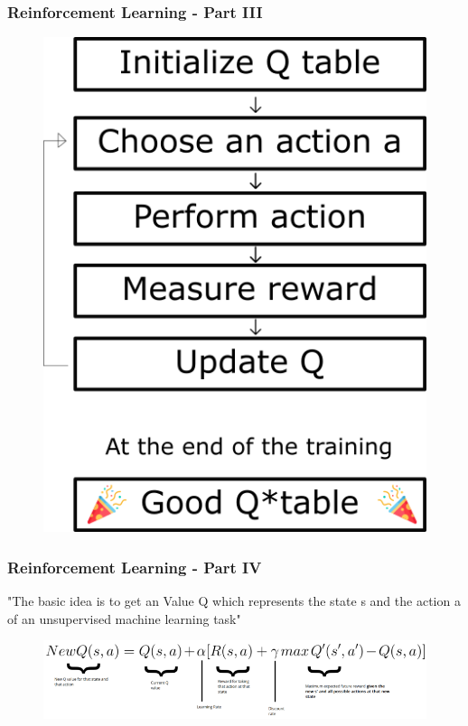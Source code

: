 \documentclass{beamer}
\begin{document}
%
%
\begin{frame}
\frametitle{Reinforcement Learning - Part III}
\begin{figure}
\includegraphics[width=0.4\linewidth]{photo/q}
\end{figure}
\end{frame}
%
%
\begin{frame}
\frametitle{Reinforcement Learning - Part IV}
"The basic idea is to get an Value Q which represents the state s and the action a of an unsupervised machine learning task"\\
\begin{figure}
\includegraphics[width=0.9\linewidth]{photo/qformula}
\end{figure}
\end{frame}
%
\end{document}
